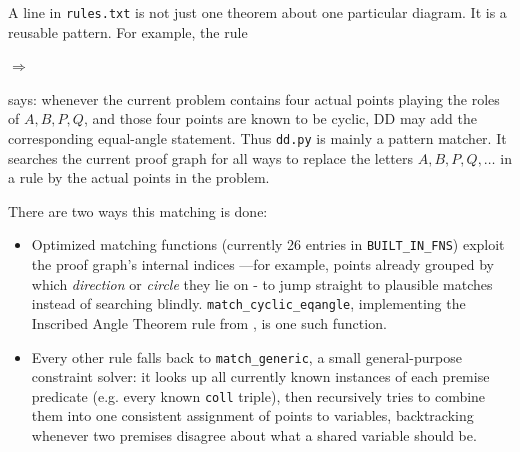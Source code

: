 \documentclass[reqno]{amsart}
\newcommand{\codeseg}[1]{%
    \begingroup
    \setlength{\fboxsep}{1.5pt}%
    \colorbox{agcodebg}{\texttt{\detokenize{#1}}}%
    \endgroup
}
\DeclareMathOperator{\1}{\textbf{1}}
\begin{document}
A line in \verb|rules.txt| is not just one theorem about one particular
diagram. It is a reusable pattern. For example, the rule
\begin{center}
\codeseg{cyclic A B P Q}
\(\Longrightarrow\)
\codeseg{eqangle P A P B Q A Q B}
\end{center}
says: whenever the current problem contains four actual points playing the
roles of \(A,B,P,Q\), and those four points are known to be cyclic, DD may
add the corresponding equal-angle statement. Thus \verb|dd.py| is mainly a
pattern matcher. It searches the current proof graph for all ways to replace
the letters \(A,B,P,Q,\ldots\) in a rule by the actual points in the problem.

There are two ways this matching is done:

\begin{itemize}
    \item Optimized matching functions (currently 26 entries in
          \verb|BUILT_IN_FNS|) exploit the proof graph's internal indices
          ---for example, points
          already grouped by which \emph{direction} or \emph{circle} they lie
          on - to jump straight to plausible matches instead of searching
          blindly. \verb|match_cyclic_eqangle|, implementing the Inscribed
          Angle Theorem rule from , is one such
          function.
    \item Every other rule falls back to \verb|match_generic|, a small
          general-purpose constraint solver: it looks up all currently known
          instances of each premise predicate (e.g. every known \verb|coll|
          triple), then recursively tries to combine them into one consistent
          assignment of points to variables, backtracking whenever two
          premises disagree about what a shared variable should be.
\end{itemize}
\end{document}
